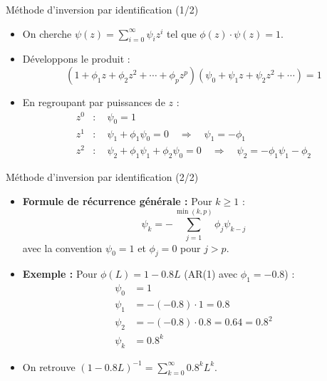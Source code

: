 \documentclass[11pt,aspectratio=169]{beamer}
\begin{document}
\begin{frame}{Méthode d'inversion par identification (1/2)}

\begin{itemize}

\item On cherche $\psi(z) = \sum_{i=0}^{\infty} \psi_i z^i$ tel que $\phi(z) \cdot \psi(z) = 1$.\newline

\item Développons le produit :
  \[
  (1 + \phi_1 z + \phi_2 z^2 + \cdots + \phi_p z^p)(\psi_0 + \psi_1 z + \psi_2 z^2 + \cdots) = 1
  \]\newline

\item En regroupant par puissances de $z$ :
  \begin{align*}
  z^0 &: \quad \psi_0 = 1 \\
  z^1 &: \quad \psi_1 + \phi_1 \psi_0 = 0 \quad \Rightarrow \quad \psi_1 = -\phi_1 \\
  z^2 &: \quad \psi_2 + \phi_1 \psi_1 + \phi_2 \psi_0 = 0 \quad \Rightarrow \quad \psi_2 = -\phi_1 \psi_1 - \phi_2
  \end{align*}

\end{itemize}

\end{frame}

\begin{frame}{Méthode d'inversion par identification (2/2)}

\begin{itemize}

\item \textbf{Formule de récurrence générale :} Pour $k \geq 1$ :
  \[
  \boxed{\psi_k = -\sum_{j=1}^{\min(k,p)} \phi_j \psi_{k-j}}
  \]
  avec la convention $\psi_0 = 1$ et $\phi_j = 0$ pour $j > p$.\newline

\item \textbf{Exemple :} Pour $\phi(L) = 1 - 0.8L$ (AR(1) avec $\phi_1 = -0.8$) :
  \begin{align*}
  \psi_0 &= 1 \\
  \psi_1 &= -(-0.8) \cdot 1 = 0.8 \\
  \psi_2 &= -(-0.8) \cdot 0.8 = 0.64 = 0.8^2 \\
  \psi_k &= 0.8^k
  \end{align*}\newline

\item On retrouve $(1 - 0.8L)^{-1} = \sum_{k=0}^{\infty} 0.8^k L^k$.

\end{itemize}

\end{frame}
\end{document}
